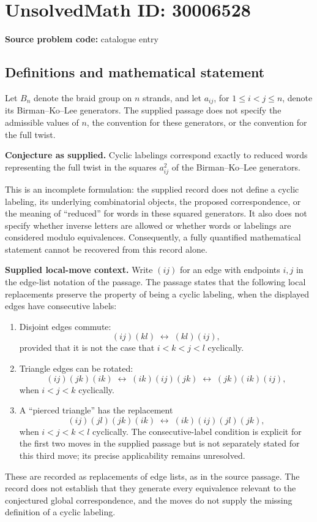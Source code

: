 \documentclass[11pt]{article}
\begin{document}
\section*{UnsolvedMath ID: 30006528}
\textbf{Source problem code:} catalogue entry
\subsection{Definitions and mathematical statement}
Let \(B_n\) denote the braid group on \(n\) strands, and let \(a_{ij}\), for \(1\leq i<j\leq n\), denote its Birman--Ko--Lee generators. The supplied passage does not specify the admissible values of \(n\), the convention for these generators, or the convention for the full twist.

\textbf{Conjecture as supplied.} Cyclic labelings correspond exactly to reduced words representing the full twist in the squares \(a_{ij}^{2}\) of the Birman--Ko--Lee generators.

This is an incomplete formulation: the supplied record does not define a cyclic labeling, its underlying combinatorial objects, the proposed correspondence, or the meaning of ``reduced'' for words in these squared generators. It also does not specify whether inverse letters are allowed or whether words or labelings are considered modulo equivalences. Consequently, a fully quantified mathematical statement cannot be recovered from this record alone.

\textbf{Supplied local-move context.} Write \((ij)\) for an edge with endpoints \(i,j\) in the edge-list notation of the passage. The passage states that the following local replacements preserve the property of being a cyclic labeling, when the displayed edges have consecutive labels:
\begin{enumerate}
\item Disjoint edges commute:
\[
(ij)(kl)\;\longleftrightarrow\;(kl)(ij),
\]
provided that it is not the case that \(i<k<j<l\) cyclically.
\item Triangle edges can be rotated:
\[
(ij)(jk)(ik)\;\longleftrightarrow\;(ik)(ij)(jk)
\;\longleftrightarrow\;(jk)(ik)(ij),
\]
when \(i<j<k\) cyclically.
\item A ``pierced triangle'' has the replacement
\[
(ij)(jl)(jk)(ik)\;\longleftrightarrow\;(ik)(ij)(jl)(jk),
\]
when \(i<j<k<l\) cyclically. The consecutive-label condition is explicit for the first two moves in the supplied passage but is not separately stated for this third move; its precise applicability remains unresolved.
\end{enumerate}
These are recorded as replacements of edge lists, as in the source passage. The record does not establish that they generate every equivalence relevant to the conjectured global correspondence, and the moves do not supply the missing definition of a cyclic labeling.
\end{document}
